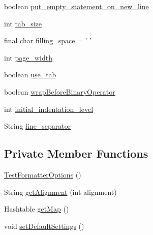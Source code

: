 \begin{DoxyCompactItemize}
\item 
boolean \hyperlink{classorg_1_1eclipse_1_1jdt_1_1ui_1_1tests_1_1refactoring_1_1infra_1_1TestFormatterOptions_ad041224992ad8a0c4df017271316d095}{put\_\-empty\_\-statement\_\-on\_\-new\_\-line}
\item 
int \hyperlink{classorg_1_1eclipse_1_1jdt_1_1ui_1_1tests_1_1refactoring_1_1infra_1_1TestFormatterOptions_a0a456cba3aa1a5958a96cd6d58fbd7cd}{tab\_\-size}
\item 
final char \hyperlink{classorg_1_1eclipse_1_1jdt_1_1ui_1_1tests_1_1refactoring_1_1infra_1_1TestFormatterOptions_a619bccb0663442ec2249c612ff80264c}{filling\_\-space} = ' '
\item 
int \hyperlink{classorg_1_1eclipse_1_1jdt_1_1ui_1_1tests_1_1refactoring_1_1infra_1_1TestFormatterOptions_aca93f41c97def3c71ec16f660e2f4044}{page\_\-width}
\item 
boolean \hyperlink{classorg_1_1eclipse_1_1jdt_1_1ui_1_1tests_1_1refactoring_1_1infra_1_1TestFormatterOptions_a662e53b70676b01dbf7c108ce7142729}{use\_\-tab}
\item 
boolean \hyperlink{classorg_1_1eclipse_1_1jdt_1_1ui_1_1tests_1_1refactoring_1_1infra_1_1TestFormatterOptions_a28a8afd31e2f9fdec091772d2edb0e46}{wrapBeforeBinaryOperator}
\item 
int \hyperlink{classorg_1_1eclipse_1_1jdt_1_1ui_1_1tests_1_1refactoring_1_1infra_1_1TestFormatterOptions_abb12528a1576ffba8c1ae22a18f6eb8b}{initial\_\-indentation\_\-level}
\item 
String \hyperlink{classorg_1_1eclipse_1_1jdt_1_1ui_1_1tests_1_1refactoring_1_1infra_1_1TestFormatterOptions_ab1249a7df9e45c469abf0378cceb35f6}{line\_\-separator}
\end{DoxyCompactItemize}
\subsection*{Private Member Functions}
\begin{DoxyCompactItemize}
\item 
\hyperlink{classorg_1_1eclipse_1_1jdt_1_1ui_1_1tests_1_1refactoring_1_1infra_1_1TestFormatterOptions_afbfb97e87360fcc9fc80968455120b76}{TestFormatterOptions} ()
\item 
String \hyperlink{classorg_1_1eclipse_1_1jdt_1_1ui_1_1tests_1_1refactoring_1_1infra_1_1TestFormatterOptions_a278d80feb2eaa9fe417a1dafd95c09ad}{getAlignment} (int alignment)
\item 
Hashtable \hyperlink{classorg_1_1eclipse_1_1jdt_1_1ui_1_1tests_1_1refactoring_1_1infra_1_1TestFormatterOptions_a377d5ab03aff2359a0199cdc610ea638}{getMap} ()
\item 
void \hyperlink{classorg_1_1eclipse_1_1jdt_1_1ui_1_1tests_1_1refactoring_1_1infra_1_1TestFormatterOptions_a1448616d4b9e4fc9c747f819e74750b8}{setDefaultSettings} ()
\end{DoxyCompactItemize}


